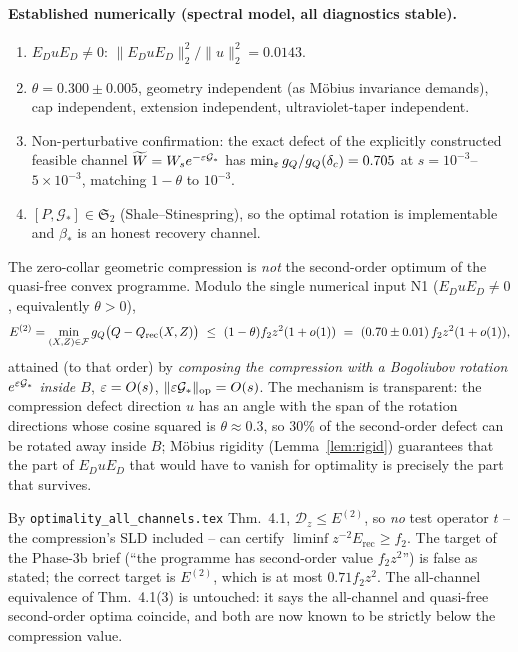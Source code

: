 \documentclass[11pt]{article}
\newcommand{\Erecc}{E_{\mathrm{rec}}}
\newcommand{\Stwo}{\mathfrak S_2}
\begin{document}
\paragraph{Established numerically (spectral model, all diagnostics stable).}
\begin{enumerate}[leftmargin=1.8em,itemsep=1pt]
\item[\textbf{N1}] $E_DuE_D\neq0$: $\|E_DuE_D\|_2^2/\|u\|_2^2=0.0143$.
\item[\textbf{N2}] $\theta=0.300\pm0.005$, geometry independent (as M\"obius invariance
 demands), cap independent, extension independent, ultraviolet-taper independent.
\item[\textbf{N3}] Non-perturbative confirmation: the exact defect of the explicitly
 constructed feasible channel $\widetilde W=W_se^{-\varepsilon\mathcal G_*}$ has
 $\min_\varepsilon g_Q/g_Q(\delta_c)=0.705$ at $s=10^{-3}$--$5\times10^{-3}$, matching
 $1-\theta$ to $10^{-3}$.
\item[\textbf{N4}] $[P,\mathcal G_*]\in\Stwo$ (Shale--Stinespring), so the optimal
 rotation is implementable and $\beta_*$ is an honest recovery channel.
\end{enumerate}

\begin{verdictbreak}
The zero-collar geometric compression is \emph{not} the second-order optimum of the
quasi-free convex programme.  Modulo the single numerical input N1
($E_DuE_D\neq0$, equivalently $\theta>0$),
\[
 E^{(2)}=\min_{(X,Z)\in\mathcal F}g_Q\bigl(Q-Q_{\rm rec}(X,Z)\bigr)\ \le\ (1-\theta)f_2z^2(1+o(1))
 \ =\ (0.70\pm0.01)\,f_2z^2(1+o(1)) ,
\]
attained (to that order) by \emph{composing the compression with a Bogoliubov rotation
$e^{\varepsilon\mathcal G_*}$ inside $B$}, $\varepsilon=O(s)$, $\|\varepsilon\mathcal G_*\|_{\rm op}=O(s)$.
The mechanism is transparent: the compression defect direction $u$ has an angle with the
span of the rotation directions whose cosine squared is $\theta\approx0.3$, so $30\%$ of
the second-order defect can be rotated away inside $B$; M\"obius rigidity
(Lemma~\ref{lem:rigid}) guarantees that the part of $E_DuE_D$ that would have to vanish
for optimality is precisely the part that survives.
\end{verdictbreak}

\begin{verdictbreak}
By \texttt{optimality\_all\_channels.tex} Thm.~4.1, $\mathcal D_z\le E^{(2)}$, so
\emph{no} test operator $t$ -- the compression's SLD included -- can certify
$\liminf z^{-2}\Erecc\ge f_2$.  The target of the Phase-3b brief
(``the programme has second-order value $f_2z^2$'') is false as stated; the correct
target is $E^{(2)}$, which is at most $0.71f_2z^2$.  The all-channel equivalence of
Thm.~4.1(3) is untouched: it says the all-channel and quasi-free second-order optima
coincide, and both are now known to be strictly below the compression value.
\end{verdictbreak}
\end{document}
